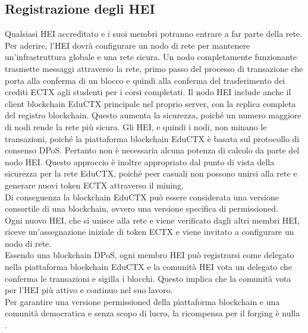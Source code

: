 \subsection{Registrazione degli HEI}
Qualsiasi HEI accreditato e i suoi membri potranno entrare a far parte della rete. 
Per aderire, l’HEI dovrà configurare un nodo di rete per mantenere un’infrastruttura globale e una rete sicura. 
Un nodo completamente funzionante trasmette messaggi attraverso la rete, primo passo del processo di transazione che porta alla conferma di un blocco e quindi alla conferma del trasferimento dei crediti ECTX agli studenti per i corsi completati. 
Il nodo HEI include anche il client blockchain EduCTX principale nel proprio server, con la replica completa del registro blockchain. Questo aumenta la sicurezza, poiché un numero maggiore di nodi rende la rete più sicura.
Gli HEI, e quindi i nodi, non minano le transazioni, poiché la piattaforma blockchain EduCTX è basata sul protocollo di consenso DPoS. Pertanto non è necessaria alcuna potenza di calcolo da parte del nodo HEI. 
Questo approccio è inoltre appropriato dal punto di vista della sicurezza per la rete EduCTX, poiché peer casuali non possono unirsi alla rete e generare nuovi token ECTX attraverso il mining. 
\\Di conseguenza la blockchain EduCTX può essere considerata una versione consortile di una blockchain, ovvero una versione specifica di permissioned.
\\Ogni nuovo HEI, che si unisce alla rete e viene verificato dagli altri membri HEI, riceve un’assegnazione iniziale di token ECTX e viene invitato a configurare un nodo di rete. 
\\Essendo una blockchain DPoS, ogni membro HEI può registrarsi come delegato nella piattaforma blockchain EduCTX e la comunità HEI vota un delegato che conferma le transazioni e sigilla i blocchi. 
Questo implica che la comunità vota per l’HEI più attivo e continuo nel suo lavoro. 
\\Per garantire una versione permissioned della piattaforma blockchain e una comunità democratica e senza scopo di lucro, la ricompensa per il forging è nulla \cite{EduCTX}.


